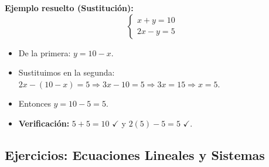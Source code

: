 \documentclass[12pt, a4paper]{article}
\begin{document}
\noindent\textbf{Ejemplo resuelto (Sustitución):}
$$\begin{cases} x + y = 10 \\ 2x - y = 5 \end{cases}$$

\begin{itemize}
  \item De la primera: $y = 10 - x$.
  \item Sustituimos en la segunda: $2x - (10 - x) = 5 \Rightarrow 3x - 10 = 5 \Rightarrow 3x = 15 \Rightarrow x = 5$.
  \item Entonces $y = 10 - 5 = 5$.
  \item \textbf{Verificación:} $5 + 5 = 10$ $\checkmark$ y $2(5) - 5 = 5$ $\checkmark$.
\end{itemize}

\newpage

\subsection{Ejercicios: Ecuaciones Lineales y Sistemas}
\end{document}
